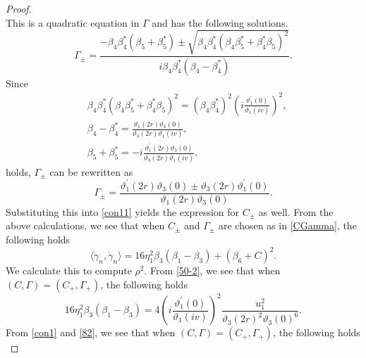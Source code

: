 \documentclass[10pt,leqno]{amsart}
\numberwithin{equation}{section}
\begin{document}
\begin{proof}
\begin{equation}
\end{equation}
This is a quadratic equation in $\Gamma$ and has the following solutions.
\begin{equation}\label{solGam}
\Gamma_{\pm}=\frac{-\beta_{4}\beta_{4}^{*}\left(\beta_{5}+\beta_{5}^{*}\right)\pm\sqrt{\beta_{4}\beta_{4}^{*}\left(\beta_{4}\beta_{5}^{*}+\beta_{4}^{*}\beta_{5}\right)^{2}}}{i\beta_{4}\beta_{4}^{*}\left(\beta_{4}-\beta_{4}^{*}\right)}.
\end{equation}
Since
\begin{equation}
\begin{split}
&\beta_{4}\beta_{4}^{*}\left(\beta_{4}\beta_{5}^{*}+\beta_{4}^{*}\beta_{5}\right)^{2}=\left(\beta_{4}\beta_{4}^{*}\right)^{2}\left(i\frac{\vartheta_{1}^{'}(0)}{\vartheta_{1}(iv)}\right)^{2},\\
&\beta_{4}-\beta_{4}^{*}=\frac{\vartheta_{1}(2r)\vartheta_{3}(0)}{\vartheta_{3}(2r)\vartheta_{1}(iv)},\\
&\beta_{5}+\beta_{5}^{*}=-i\frac{\vartheta_{1}^{'}(2r)\vartheta_{3}(0)}{\vartheta_{3}(2r)\vartheta_{1}(iv)},
\end{split}
\end{equation}
holds, $\Gamma_{\pm}$ can be rewritten as
\begin{equation}\label{solGam2}
\Gamma_{\pm}=\frac{\vartheta_{1}^{'}(2r)\vartheta_{3}(0)\pm\vartheta_{3}\left(2r\right)\vartheta_{1}^{'}(0)}{\vartheta_{1}\left(2r\right)\vartheta_{3}\left(0\right)}.
\end{equation}
Substituting this into \eqref{con11} yields the expression for $C_{\pm}$ as well.
From the above calculations, we see that when $C_{\pm}$ and $\Gamma_{\pm}$ are chosen as in \eqref{CGamma}, the following holds
\begin{equation}
    \langle\dot{\gamma}_{n}, \dot{\gamma}_{n}\rangle=16\eta_{1}^{2}\beta_{3}\left(\beta_{1}-\beta_{3}\right)+\left(\beta_{6}+C\right)^{2}.
\end{equation}
We calculate this to compute $\rho^2$.
From \eqref{50-2}, we see that when $(C,\Gamma)=(C_+,\Gamma_+)$, the following holds
\begin{equation}\label{prf:prop12-1}
16\eta_{1}^{2}\beta_{3}\left(\beta_{1}-\beta_{3}\right)=4\left(i\frac{\vartheta_{1}^{'}(0)}{\vartheta_{1}(iv)}\right)^{2}\frac{u_{1}^{2}}{\vartheta_{3}(2r)^{2}\vartheta_{3}(0)^{6}}.
\end{equation}
From \eqref{con1} and \eqref{82}, we see that when $(C,\Gamma)=(C_+,\Gamma_+)$, the following holds
\begin{equation}\label{prf:prop12-2}

\end{equation}
\end{proof}
\end{document}
